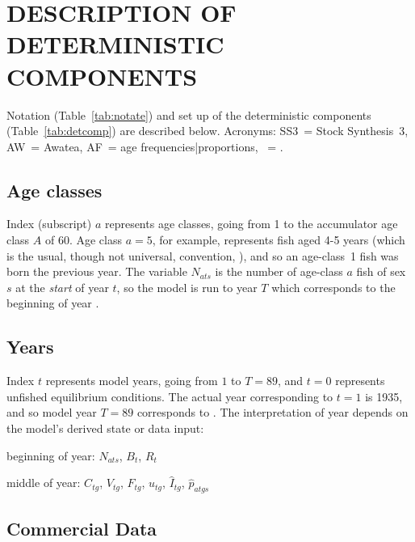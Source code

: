 \documentclass[11pt]{book}
\begin{document}

\section{DESCRIPTION OF DETERMINISTIC COMPONENTS}

Notation (Table~\ref{tab:notate}) and set up of the deterministic components (Table~\ref{tab:detcomp}) are described below. Acronyms: SS3~= Stock Synthesis~3, AW~= Awatea, AF~= age frequencies|proportions, \spc~= \spn.


\subsection{Age classes}

Index (subscript) $a$ represents age classes, going from 1 to the accumulator age class $A$ of 60. 
Age class $a=5$, for example, represents fish aged 4-5 years (which is the usual, though not universal, convention, \citealt{Caswell:2001}), and so an age-class~1 fish was born the previous year.
The variable $N_{ats}$ is the number of age-class $a$ fish of sex $s$ at the \textit{start} of year $t$, so the model is run to year $T$ which corresponds to the beginning of year \finalYr.

\subsection{Years}

Index $t$ represents model years, going from $1$ to $T=89$, and $t=0$ represents unfished equilibrium conditions. 
The actual year corresponding to $t=1$ is 1935, and so model year $T=89$ corresponds to \finalYr.
The interpretation of year depends on the model's derived state or data input:
\begin{itemize_csas}{}{}
\item beginning of year: $N_{ats}$, $B_t$, $R_t$
\item middle of year: $C_{tg}$, $V_{tg}$, $F_{tg}$, $u_{tg}$, $\widehat{I}_{tg}$, $\widehat{p}_{atgs}$
\end{itemize_csas}

\subsection{Commercial Data}
\end{document}
